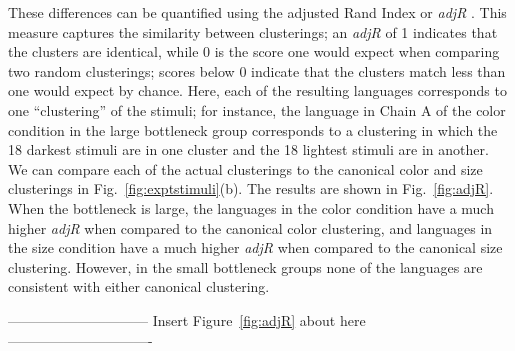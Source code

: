 \documentclass{apa}
\begin{document}
These differences can be quantified using the adjusted Rand Index or {\it adjR} \cite{hubertarabie85}. This measure captures the similarity between clusterings; an {\it adjR} of 1 indicates that the clusters are identical, while 0 is the score one would expect when comparing two random clusterings; scores below 0 indicate that the clusters match less than one would expect by chance.  Here, each of the resulting languages corresponds to one ``clustering'' of the stimuli; for instance, the language in Chain A of the {\sc color} condition in the {\sc large} bottleneck group corresponds to a clustering in which the 18 darkest stimuli are in one cluster and the 18 lightest stimuli are in another. We can compare each of the actual clusterings to the canonical color and size clusterings in Fig.~\ref{fig:exptstimuli}(b). The results are shown in Fig.~\ref{fig:adjR}. When the bottleneck is {\sc large}, the languages in the {\sc color} condition have a much higher {\it adjR} when compared to the canonical color clustering, and languages in the {\sc size} condition have a much higher {\it adjR} when compared to the canonical size clustering. However, in the {\sc small} bottleneck groups none of the languages are consistent with either canonical clustering.

\vspace{5mm}
------------------------------ Insert Figure~\ref{fig:adjR} about here -------------------------------
\vspace{5mm}
\end{document}
